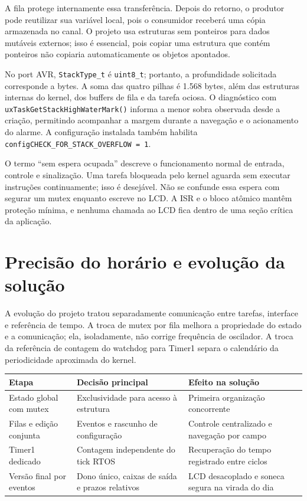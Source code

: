 A fila protege internamente essa transferência. Depois do retorno, o produtor pode reutilizar sua variável local, pois o consumidor receberá uma cópia armazenada no canal. O projeto usa estruturas sem ponteiros para dados mutáveis externos; isso é essencial, pois copiar uma estrutura que contém ponteiros não copiaria automaticamente os objetos apontados. \autocite{fonte13}

No port AVR, \texttt{StackType\_t} é \texttt{uint8\_t}; portanto, a profundidade solicitada corresponde a bytes. A soma das quatro pilhas é 1.568 bytes, além das estruturas internas do kernel, dos buffers de fila e da tarefa ociosa. O diagnóstico com \texttt{uxTaskGetStackHighWaterMark()} informa a menor sobra observada desde a criação, permitindo acompanhar a margem durante a navegação e o acionamento do alarme. A configuração instalada também habilita \texttt{configCHECK\_FOR\_STACK\_OVERFLOW = 1}. \autocite{fonte14}

O termo “sem espera ocupada” descreve o funcionamento normal de entrada, controle e sinalização. Uma tarefa bloqueada pelo kernel aguarda sem executar instruções continuamente; isso é desejável. Não se confunde essa espera com segurar um mutex enquanto escreve no LCD. A ISR e o bloco atômico mantêm proteção mínima, e nenhuma chamada ao LCD fica dentro de uma seção crítica da aplicação.

\section{Precisão do horário e evolução da solução}

A evolução do projeto tratou separadamente comunicação entre tarefas, interface e referência de tempo. A troca de mutex por fila melhora a propriedade do estado e a comunicação; ela, isoladamente, não corrige frequência de oscilador. A troca da referência de contagem do watchdog para Timer1 separa o calendário da periodicidade aproximada do kernel.

\begin{center}\small
\begin{tabularx}{\textwidth}{@{}YYY@{}}\toprule

\textbf{Etapa} & \textbf{Decisão principal} & \textbf{Efeito na solução} \\ \midrule

Estado global com mutex & Exclusividade para acesso à estrutura & Primeira organização concorrente \\

Filas e edição conjunta & Eventos e rascunho de configuração & Controle centralizado e navegação por campo \\

Timer1 dedicado & Contagem independente do tick RTOS & Recuperação do tempo registrado entre ciclos \\

Versão final por eventos & Dono único, caixas de saída e prazos relativos & LCD desacoplado e soneca segura na virada do dia \\

\bottomrule\end{tabularx}
\end{center}

